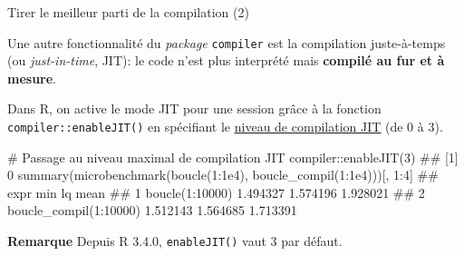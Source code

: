 \documentclass[12pt,ignorenonframetext,]{beamer}
\newenvironment{Shaded}{}{}
\newcommand{\KeywordTok}[1]{\textcolor[rgb]{0.00,0.00,1.00}{#1}}
\newcommand{\DecValTok}[1]{#1}
\newcommand{\FloatTok}[1]{#1}
\newcommand{\CommentTok}[1]{\textcolor[rgb]{0.00,0.50,0.00}{#1}}
\newcommand{\OperatorTok}[1]{#1}
\newcommand{\NormalTok}[1]{#1}
\renewenvironment{Shaded}{\begin{snugshade}}{\end{snugshade}}
\newcommand{\intertitre}[1]{\textcolor{redInsee}{\textbf{#1}}}
\begin{document}
\begin{frame}[fragile]{Tirer le meilleur parti de la compilation (2)}

Une autre fonctionnalité du \emph{package} \texttt{compiler} est la
compilation \og juste-à-temps \fg{} (ou \textit{just-in-time}, JIT): le
code n'est plus interprété mais \textbf{compilé au fur et à mesure}.

\bigskip \pause Dans R, on active le mode JIT pour une session grâce à
la fonction \texttt{compiler::enableJIT()} en spécifiant le
\href{https://stat.ethz.ch/R-manual/R-devel/library/compiler/html/compile.html}{\underline{niveau de compilation JIT}}
(de 0 à 3).

\pause \footnotesize

\begin{Shaded}
\begin{Highlighting}[]
\CommentTok{# Passage au niveau maximal de compilation JIT}
\NormalTok{compiler}\OperatorTok{::}\KeywordTok{enableJIT}\NormalTok{(}\DecValTok{3}\NormalTok{)}
\NormalTok{  ## [1] 0}
\KeywordTok{summary}\NormalTok{(}\KeywordTok{microbenchmark}\NormalTok{(}\KeywordTok{boucle}\NormalTok{(}\DecValTok{1}\OperatorTok{:}\FloatTok{1e4}\NormalTok{), }\KeywordTok{boucle_compil}\NormalTok{(}\DecValTok{1}\OperatorTok{:}\FloatTok{1e4}\NormalTok{)))[, }\DecValTok{1}\OperatorTok{:}\DecValTok{4}\NormalTok{]}
\NormalTok{  ##                     expr      min       lq     mean}
\NormalTok{  ## 1        boucle(1:10000) 1.494327 1.574196 1.928021}
\NormalTok{  ## 2 boucle_compil(1:10000) 1.512143 1.564685 1.713391}
\end{Highlighting}
\end{Shaded}

\pause \small \intertitre{Remarque} Depuis R 3.4.0, \texttt{enableJIT()}
vaut 3 par défaut.

\end{frame}
\end{document}
